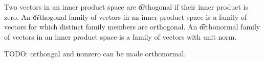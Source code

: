 


Two vectors in an inner product space are \t{orthogonal} if their inner product is zero.
An \t{orthogonal family of vectors} in an inner product space is a family of vectors for which distinct family members are orthogonal.
An \t{orthonormal family of vectors} in an inner product space is a family of vectors with unit norm.

\begin{prop}
  TODO: orthongal and nonzero can be made orthonormal.
\end{prop}
